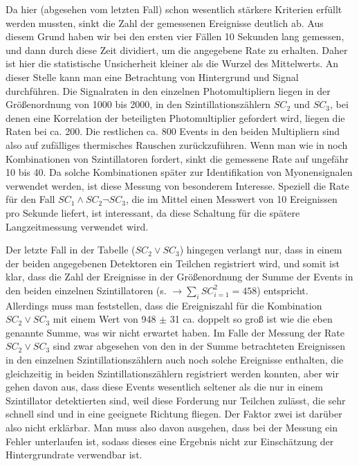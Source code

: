 Da hier (abgesehen vom letzten Fall) schon wesentlich stärkere Kriterien erfüllt
werden mussten, sinkt die Zahl der gemessenen Ereignisse deutlich ab. Aus
diesem Grund haben wir bei den ersten vier Fällen 10 Sekunden lang gemessen,
und dann durch diese Zeit dividiert, um die angegebene Rate zu erhalten. Daher
ist hier die statistische Unsicherheit kleiner als die Wurzel des Mittelwerts.
An dieser Stelle kann man eine Betrachtung von Hintergrund und Signal
durchführen. Die Signalraten in den einzelnen Photomultipliern liegen in der
Größenordnung von 1000 bis 2000, in den Szintillationszählern $SC_2$ und
$SC_3$, bei denen eine Korrelation der beteiligten Photomultiplier gefordert
wird, liegen die Raten bei ca. 200. Die restlichen ca. 800 Events in den beiden
Multipliern sind also auf zufälliges thermisches Rauschen zurückzuführen. Wenn
man wie in  noch Kombinationen von Szintillatoren
fordert, sinkt die gemessene Rate auf ungefähr 10 bis 40. Da solche
Kombinationen später zur Identifikation von Myonensignalen verwendet werden,
ist diese Messung von besonderem Interesse. Speziell die Rate für den Fall $SC_1
\wedge SC_2 \neg SC_3$, die im Mittel einen Messwert von 10 Ereignissen pro
Sekunde liefert, ist interessant, da diese Schaltung für die spätere
Langzeitmessung verwendet wird. 

Der letzte Fall in der Tabelle ($SC_2 \vee SC_3$) hingegen verlangt nur, dass in
einem der
beiden angegebenen Detektoren ein Teilchen registriert wird, und somit ist
klar, dass die Zahl der Ereignisse in der Größenordnung der Summe der Events in
den beiden einzelnen Szintillatoren (s. 
$\rightarrow \sum_i SC_{i=1}^2 = 458 $) entspricht. Allerdings muss man
feststellen, 
dass die Ereigniszahl für die Kombination $SC_2 \vee SC_3$ mit einem Wert von
948 $\pm$ 31 ca. doppelt so groß ist wie die eben genannte Summe, was wir nicht
erwartet haben. Im Falle der Messung der Rate $SC_2 \vee SC_3$ sind zwar
abgesehen von den in der Summe betrachteten Ereignissen in den einzelnen
Szintillationszählern auch noch solche Ereignisse enthalten, die gleichzeitig
in beiden Szintillationszählern registriert werden konnten, aber wir gehen
davon aus, dass diese Events wesentlich seltener als die nur in einem
Szintillator detektierten sind, weil diese Forderung nur Teilchen zulässt, die
sehr schnell sind und in eine geeignete Richtung fliegen. Der Faktor zwei ist
darüber also nicht erklärbar. Man muss also davon ausgehen, dass bei der
Messung ein Fehler unterlaufen ist, sodass dieses eine Ergebnis nicht zur
Einschätzung der Hintergrundrate verwendbar ist.

